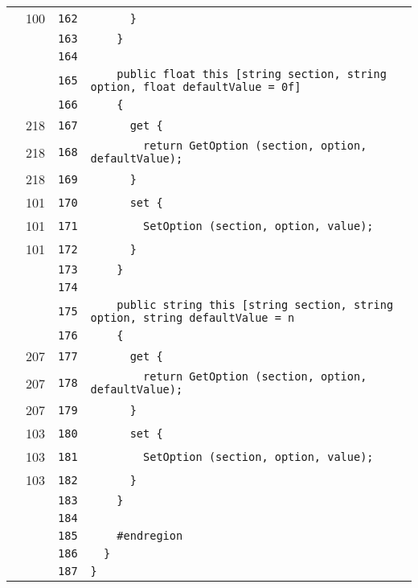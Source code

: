 \documentclass[a4paper,10pt]{article}
\begin{document}
\begin{longtable}[l]{lrrl}
\cellcolor{green} & 100 & \verb~162~ & \verb~      }~\\
\cellcolor{gray} &  & \verb~163~ & \verb~    }~\\
\cellcolor{gray} &  & \verb~164~ & \verb~~\\
\cellcolor{gray} &  & \verb~165~ & \verb~    public float this [string section, string option, float defaultValue = 0f]~\\
\cellcolor{gray} &  & \verb~166~ & \verb~    {~\\
\cellcolor{green} & 218 & \verb~167~ & \verb~      get {~\\
\cellcolor{green} & 218 & \verb~168~ & \verb~        return GetOption (section, option, defaultValue);~\\
\cellcolor{green} & 218 & \verb~169~ & \verb~      }~\\
\cellcolor{green} & 101 & \verb~170~ & \verb~      set {~\\
\cellcolor{green} & 101 & \verb~171~ & \verb~        SetOption (section, option, value);~\\
\cellcolor{green} & 101 & \verb~172~ & \verb~      }~\\
\cellcolor{gray} &  & \verb~173~ & \verb~    }~\\
\cellcolor{gray} &  & \verb~174~ & \verb~~\\
\cellcolor{gray} &  & \verb~175~ & \verb~    public string this [string section, string option, string defaultValue = n~\\
\cellcolor{gray} &  & \verb~176~ & \verb~    {~\\
\cellcolor{green} & 207 & \verb~177~ & \verb~      get {~\\
\cellcolor{green} & 207 & \verb~178~ & \verb~        return GetOption (section, option, defaultValue);~\\
\cellcolor{green} & 207 & \verb~179~ & \verb~      }~\\
\cellcolor{green} & 103 & \verb~180~ & \verb~      set {~\\
\cellcolor{green} & 103 & \verb~181~ & \verb~        SetOption (section, option, value);~\\
\cellcolor{green} & 103 & \verb~182~ & \verb~      }~\\
\cellcolor{gray} &  & \verb~183~ & \verb~    }~\\
\cellcolor{gray} &  & \verb~184~ & \verb~~\\
\cellcolor{gray} &  & \verb~185~ & \verb~    #endregion~\\
\cellcolor{gray} &  & \verb~186~ & \verb~  }~\\
\cellcolor{gray} &  & \verb~187~ & \verb~}~\\
\end{longtable}
\newpage
\end{document}
